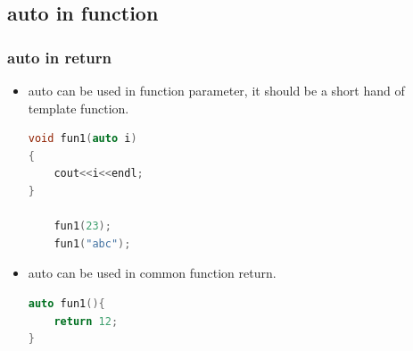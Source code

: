 \documentclass[a4paper,12pt,twoside]{book}
\begin{document}
\subsection{auto in function}

\subsubsection{auto in return}
\begin{itemize}
\item auto can be used in function parameter, it should be a short hand of template function.
\begin{lstlisting}[frame=single, language=c++]
void fun1(auto i)
{
	cout<<i<<endl;
}

	fun1(23);
	fun1("abc");
\end{lstlisting}

	\item auto can be used in common function return.
\begin{lstlisting}[frame=single, language=c++]
auto fun1(){
	return 12;
}
\end{lstlisting}

\end{itemize}
\end{document}
